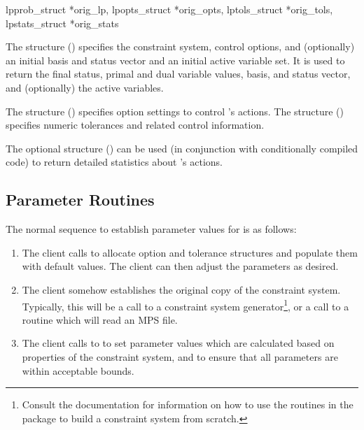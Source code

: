 \begin{subrdoc}
\item
{}
	{lpprob_struct *orig_lp, lpopts_struct *orig_opts,
         lptols_struct *orig_tols, \\ lpstats_struct *orig_stats}

The  structure () specifies the constraint
system, control options, and (optionally) an initial basis and status vector
and an initial active variable set.
It is used to return the final status, primal and dual variable values,
basis, and status vector, and (optionally) the active variables.

The  structure () specifies option
settings to control \dylp's actions.
The  structure () specifies
numeric tolerances and related control information.

The optional structure  () can
be used (in conjunction with
conditionally compiled code) to return detailed statistics about \dylp's
actions.
\end{subrdoc}

\subsection{Parameter Routines}
\label{sec:ParameterRoutines}

The normal sequence to establish parameter values for \dylp is as follows:
\begin{enumerate}
  \item
  The client calls  to allocate option and tolerance
  structures and populate them with default values.
  The client can then adjust the parameters as desired.

  \item
  The client somehow establishes the original copy of the constraint system.
  Typically, this will be a call to a constraint system generator\footnote{%
  Consult the  documentation for information on how to use
  the routines in the  package to build a constraint system
  from scratch.}, or a call
  to a routine which will read an MPS file.

  \item
  The client calls  to
  to set parameter values which are calculated based on
  properties of the constraint system, and to ensure that all parameters
  are within acceptable bounds.
\end{enumerate}



